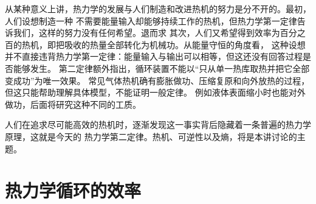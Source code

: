 {\renewcommand{\surfaceEngineDiagram}{\begin{center}\begin{tikzpicture}[x=1.5cm,y=.9cm,font=\small]
\draw[axis](0,0)--(3.35,0)node[right]{$A$};\draw[axis](0,0)--(0,4.9)node[above]{$\sigma$};
\fill[PaleBlue](.8,1)--(1.4,1)--plot[domain=1.4:2.8,samples=70](\x,{5-pow(2.8/\x,2)})--(1.6,4)--plot[domain=1.6:.8,samples=70](\x,{5-pow(1.6/\x,2)})--cycle;
\draw[revcycle](.8,1)--(1.4,1);\draw[revcycle,domain=1.4:2.8,samples=70]plot(\x,{5-pow(2.8/\x,2)});
\draw[revcycle](2.8,4)--(1.6,4);\draw[revcycle,domain=1.6:.8,samples=70]plot(\x,{5-pow(1.6/\x,2)});
\foreach \x/\y/\n/\a in {.8/1/1/left,1.4/1/2/below right,2.8/4/3/right,1.6/4/4/above left}{\fill(\x,\y)circle(1.4pt)node[\a]{$\n$};}
\node[left]at(0,1){$\sigma_h$};\node[left]at(0,4){$\sigma_c$};
\node[anchor=west,align=left]at(4.2,3.4){$\sigma(T)=\sigma_*-aT^2$\\[6pt]等熵线：$AT=\text{常量}$\\[6pt]$1\to2$：高温扩面\\[6pt]$3\to4$：低温缩面};
\node[anchor=west]at(4.2,1){$W_{\rm out}=-\oint\sigma\dd A>0$};
\end{tikzpicture}\end{center}\nopagebreak[2]}


从某种意义上讲，热力学的发展与人们制造和改进热机的努力是分不开的。最初，人们设想制造一种
不需要能量输入却能够持续工作的热机，但热力学第一定律告诉我们，这样的努力没有任何希望。退而求
其次，人们又希望得到效率为百分之百的热机，即把吸收的热量全部转化为机械功。从能量守恒的角度看，
这种设想并不直接违背热力学第一定律：能量输入与输出可以相等，但这还没有回答过程是否能够发生。
第二定律额外指出，循环装置不能以“只从单一热库取热并把它全部变成功”为唯一效果。
常见气体热机确有膨胀做功、压缩复原和向外放热的过程，但这只能帮助理解具体模型，不能证明一般定律。
例如液体表面缩小时也能对外做功，后面将研究这种不同的工质。

人们在追求尽可能高效的热机时，逐渐发现这一事实背后隐藏着一条普遍的热力学原理，这就是今天的
热力学第二定律。热机、可逆性以及熵，将是本讲讨论的主题。

\section{热力学循环的效率}

}
